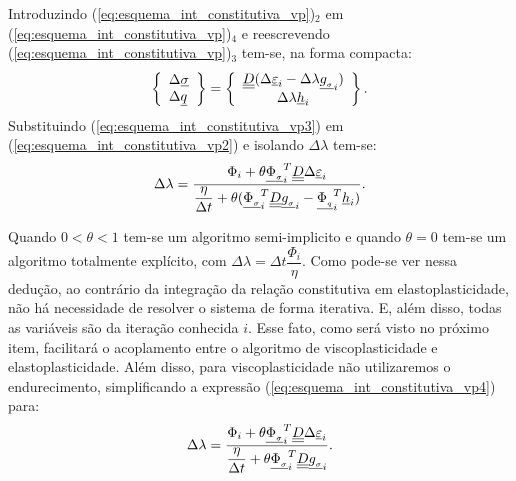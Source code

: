 Introduzindo (\ref{eq:esquema_int_constitutiva_vp})$_2$ em (\ref{eq:esquema_int_constitutiva_vp})$_4$ e reescrevendo (\ref{eq:esquema_int_constitutiva_vp})$_3$ tem-se, na forma compacta:
\begin{equation}
	\label{eq:esquema_int_constitutiva_vp3}
	\left\{ \begin{array}{lcl} \Delta \underline \sigma \\ \Delta \underline q \end{array} \right\} = \left\{ \begin{array}{ccc} \underline{\underline D}(\Delta\underline{\varepsilon}_i -\Delta \lambda \underline{g_{_\sigma}}_i) \\ \Delta \lambda \underline h_i \end{array} \right\}.
\end{equation}
Substituindo (\ref{eq:esquema_int_constitutiva_vp3}) em (\ref{eq:esquema_int_constitutiva_vp2}) e isolando $\Delta \lambda$ tem-se:
\begin{equation}
	\label{eq:esquema_int_constitutiva_vp4}
	\Delta \lambda = \dfrac{\Phi_i + \theta \underline{\Phi_{_\sigma}}_i^T\underline{\underline D}\Delta\underline{\varepsilon}_i}{\dfrac{\eta}{\Delta t} + \theta (\underline{\Phi_{_\sigma}}_i^T\underline{\underline D}\underline{g_{_\sigma}}_i - \underline{\Phi_{_q}}_i^T \underline h_i)}.
\end{equation}

Quando $0 < \theta < 1$  tem-se um algoritmo semi-implicito e quando $\theta = 0$ tem-se um algoritmo totalmente explícito, com $\Delta \lambda = \Delta t \dfrac{\Phi_i}{\eta}$. Como pode-se ver nessa dedução, ao contrário da integração da relação constitutiva em elastoplasticidade, não há necessidade de resolver o sistema de forma iterativa. E, além disso, todas as variáveis são da iteração conhecida $i$. Esse fato, como será visto no próximo item, facilitará o acoplamento entre o algoritmo de viscoplasticidade e elastoplasticidade. Além disso, para viscoplasticidade não utilizaremos o endurecimento, simplificando a expressão (\ref{eq:esquema_int_constitutiva_vp4}) para:
\begin{equation}
	\label{eq:esquema_int_constitutiva_vp5}
	\Delta \lambda = \dfrac{\Phi_i + \theta \underline{\Phi_{_\sigma}}_i^T\underline{\underline D}\Delta\underline{\varepsilon}_i}{\dfrac{\eta}{\Delta t} + \theta \underline{\Phi_{_\sigma}}_i^T\underline{\underline D}\underline{g_{_\sigma}}_i}.
\end{equation}

